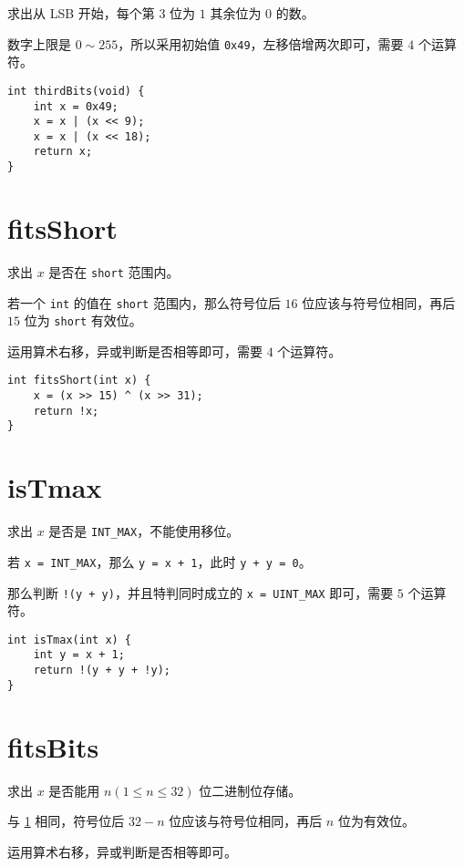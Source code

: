 \documentclass{noithesis}
\begin{document}
	求出从 LSB 开始，每个第 $3$ 位为 $1$ 其余位为 $0$ 的数。
	
	数字上限是 $0\sim 255$，所以采用初始值 \verb|0x49|，左移倍增两次即可，需要 $4$ 个运算符。
	
\begin{lstlisting}
int thirdBits(void) {
	int x = 0x49;
	x = x | (x << 9);
	x = x | (x << 18);
	return x;
}
\end{lstlisting}
	
	\section{fitsShort}
	\label{fitsShort}
	
	求出 $x$ 是否在 \verb|short| 范围内。
	
	若一个 \verb|int| 的值在 \verb|short| 范围内，那么符号位后 $16$ 位应该与符号位相同，再后 $15$ 位为 \verb|short| 有效位。
	
	运用算术右移，异或判断是否相等即可，需要 $4$ 个运算符。
	
\begin{lstlisting}
int fitsShort(int x) {
	x = (x >> 15) ^ (x >> 31);
	return !x;
}
\end{lstlisting}

	\section{isTmax}
	
	求出 $x$ 是否是 \verb|INT_MAX|，不能使用移位。
	
	若 \verb|x = INT_MAX|，那么 \verb|y = x + 1|，此时 \verb|y + y = 0|。
	
	那么判断 \verb|!(y + y)|，并且特判同时成立的 \verb|x = UINT_MAX| 即可，需要 $5$ 个运算符。
	
\begin{lstlisting}
int isTmax(int x) {
	int y = x + 1;
	return !(y + y + !y);
}
\end{lstlisting} 

	\section{fitsBits}
	\label{fitsBits}
	
	求出 $x$ 是否能用 $n(1\leq n\leq 32)$ 位二进制位存储。
	
	与 \ref{fitsShort} 相同，符号位后 $32 - n$ 位应该与符号位相同，再后 $n$ 位为有效位。
	
	运用算术右移，异或判断是否相等即可。
	
\end{document}
